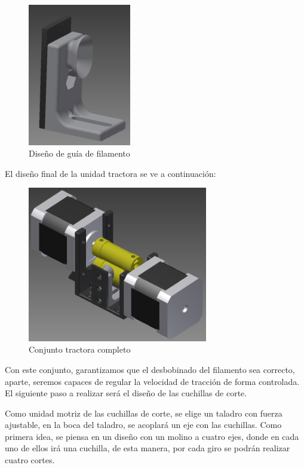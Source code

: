    \begin{figure}[H]
            \centering
            \includegraphics[width=0.4\textwidth]{images/peletizadora/guia.png}
            \caption{Diseño de guía de filamento}
            \label{fig:peletizadora_guia}
    \end{figure}

El diseño final de la unidad tractora se ve a continuación:

    \begin{figure}[H]
            \centering
            \includegraphics[width=0.7\textwidth]{images/peletizadora/conjunto_tractora.png}
            \caption{Conjunto tractora completo}
            \label{fig:peletizadora_conjunto}
    \end{figure}

Con este conjunto, garantizamos que el desbobinado del filamento sea correcto, aparte, seremos capaces de regular la velocidad de tracción de forma controlada. El siguiente paso a realizar será el diseño de las cuchillas de corte.

Como unidad motriz de las cuchillas de corte, se elige un taladro con fuerza ajustable, en la boca del taladro, se acoplará un eje con las cuchillas. Como primera idea, se piensa en un diseño con un molino a cuatro ejes, donde en cada uno de ellos irá una cuchilla, de esta manera, por cada giro se podrán realizar cuatro cortes.

